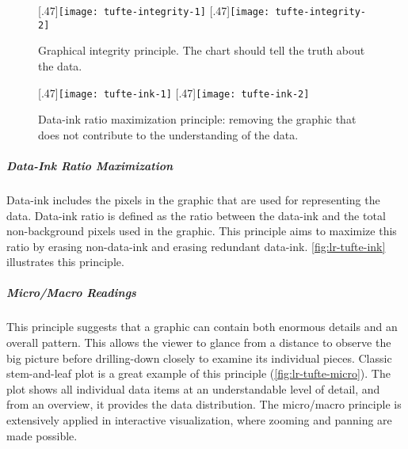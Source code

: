 \begin{figure}
	\centering
	[.47\columnwidth]{\texttt{[image: tufte-integrity-1]}}
	\hfill
	[.47\columnwidth]{\texttt{[image: tufte-integrity-2]}}
	\caption[Graphical integrity principle]{Graphical integrity principle. The chart should tell the truth about the data.}
	\label{fig:lr-tufte-integrity}
\end{figure}

\begin{figure}
	\centering
	[.47\columnwidth]{\texttt{[image: tufte-ink-1]}}
	\hfill
	[.47\columnwidth]{\texttt{[image: tufte-ink-2]}}
	\caption[Data-ink ratio maximization principle]{Data-ink ratio maximization principle: removing the graphic that does not contribute to the understanding of the data.}
	\label{fig:lr-tufte-ink}
\end{figure}

\subparagraph{Data-Ink Ratio Maximization}
Data-ink includes the pixels in the graphic that are used for representing the data. Data-ink ratio is defined as the ratio between the data-ink and the total non-background pixels used in the graphic. This principle aims to maximize this ratio by erasing non-data-ink and erasing redundant data-ink. \autoref{fig:lr-tufte-ink} illustrates this principle.

\subparagraph{Micro/Macro Readings}
This principle suggests that a graphic can contain both enormous details and an overall pattern. This allows the viewer to glance from a distance to observe the big picture before drilling-down closely to examine its individual pieces. Classic stem-and-leaf plot is a great example of this principle (\autoref{fig:lr-tufte-micro}). The plot shows all individual data items at an understandable level of detail, and from an overview, it provides the data distribution. The micro/macro principle is extensively applied in interactive visualization, where zooming and panning are made possible.

